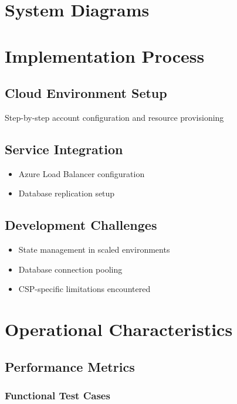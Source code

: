 \documentclass{llncs}
\begin{document}
\section{System Diagrams}

\section{Implementation Process}
\subsection{Cloud Environment Setup}
Step-by-step account configuration and resource provisioning

\subsection{Service Integration}
\begin{itemize}
    \item Azure Load Balancer configuration
    \item Database replication setup
\end{itemize}

\subsection{Development Challenges}
\begin{itemize}
    \item State management in scaled environments
    \item Database connection pooling
    \item CSP-specific limitations encountered
\end{itemize}

\section{Operational Characteristics}
\subsection{Performance Metrics}

\subsubsection{Functional Test Cases}
\end{document}
